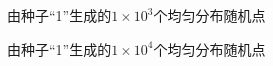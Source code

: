 \documentclass[a4paper,11pt]{article}
\begin{document}
\begin{figure}[!htbp]        
\caption{\label{1} 由种子“1”生成的$1 \times 10^{3}$个均匀分布随机点}      
\end{figure}


\begin{figure}[!htbp]        
\caption{\label{1} 由种子“1”生成的$1 \times 10^{4}$个均匀分布随机点}      
\end{figure}
\end{document}
